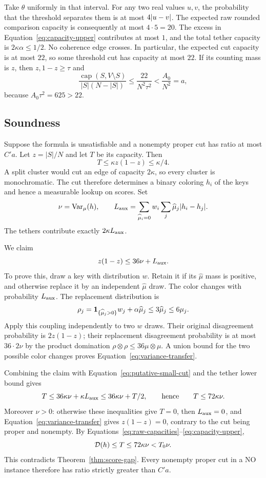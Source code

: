 Take $\theta$ uniformly in that interval.  For any two real values $u,v$,
the probability that the threshold separates them is at most $4\lvert u-v\rvert$.
The expected raw rounded comparison capacity is consequently at most
$4\cdot5=20$.  The excess in Equation~\eqref{eq:capacity-upper} contributes
at most $1$, and the total tether capacity is
$2\kappa\alpha\le1/2$.  No coherence edge crosses.  In particular, the
expected cut capacity is at most $22$, so some threshold cut has capacity
at most $22$.  If its counting mass is $z$, then $z,1-z\ge\tau$ and
\[
 \frac{\operatorname{cap}(S,V\setminus S)}{|S|(N-|S|)}
 \le\frac{22}{N^2\tau^2}
 <\frac{A_0}{N^2}=a,
\]
because $A_0\tau^2=625>22$.

\subsection{Soundness}

Suppose the formula is unsatisfiable and a nonempty proper cut has ratio
at most $C'a$.  Let $z=|S|/N$ and let $T$ be its capacity.  Then
\begin{equation}\label{eq:putative-small-cut}
 T\le\kappa z(1-z)\le\kappa/4.
\end{equation}
A split cluster would cut an edge of capacity $2\kappa$, so every cluster
is monochromatic.  The cut therefore determines a binary coloring $h_i$
of the keys and hence a measurable lookup on scores.  Set
\[
 \nu=\operatorname{Var}_\mu(h),\qquad
 L_{\rm aux}=\sum_{\widehat\mu_i=0}w_i
                    \sum_j\widehat\mu_j\lvert h_i-h_j\rvert.
\]
The tethers contribute exactly $2\kappa L_{\rm aux}$.

We claim
\begin{equation}\label{eq:variance-transfer}
 z(1-z)\le36\nu+L_{\rm aux}.
\end{equation}
To prove this, draw a key with distribution $w$.  Retain it if its
$\widehat\mu$ mass is positive, and otherwise replace it by an independent
$\widehat\mu$ draw.  The color changes with probability $L_{\rm aux}$.
The replacement distribution is
\[
 \rho_j=\mathbf 1_{\{\widehat\mu_j>0\}}w_j+\alpha\widehat\mu_j
 \le3\widehat\mu_j\le6\mu_j.
\]
Apply this coupling independently to two $w$ draws.  Their original
disagreement probability is $2z(1-z)$; their replacement disagreement
probability is at most $36\cdot2\nu$ by the product domination
$\rho\otimes\rho\le36\mu\otimes\mu$.  A union bound for the two possible
color changes proves Equation~\eqref{eq:variance-transfer}.

Combining the claim with Equation~\eqref{eq:putative-small-cut} and the
tether lower bound gives
\[
 T\le36\kappa\nu+\kappa L_{\rm aux}
 \le36\kappa\nu+T/2,
 \qquad\text{hence}\qquad T\le72\kappa\nu.
\]
Moreover $\nu>0$: otherwise these inequalities give $T=0$, then
$L_{\rm aux}=0$, and Equation~\eqref{eq:variance-transfer} gives
$z(1-z)=0$, contrary to the cut being proper and nonempty.
By Equations~\eqref{eq:raw-capacities}--\eqref{eq:capacity-upper},
\[
 \mathcal D(h)\le T\le72\kappa\nu<T_0\nu.
\]
This contradicts Theorem~\ref{thm:score-gap}.  Every nonempty proper cut in
a NO instance therefore has ratio strictly greater than $C'a$.

